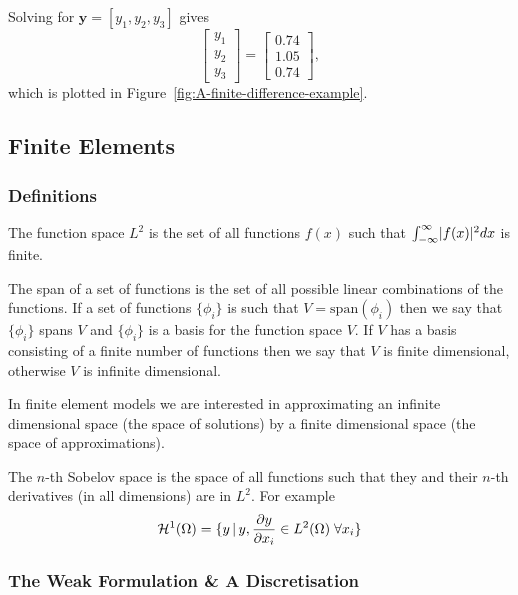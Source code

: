 Solving for $\mathbf{y} = [ y_1, y_2, y_3]$ gives
\begin{equation*}
  \left[
    \begin{array}{c}
      y_{1}\\ y_{2}\\ y_{3}
    \end{array}
  \right]=\left[
    \begin{array}{c}
      0.74\\ 1.05\\ 0.74
    \end{array}
  \right],
\end{equation*}
which is plotted in Figure~\ref{fig:A-finite-difference-example}.


\subsection{Finite Elements}
\label{sec:finite-elements-one-d}

\subsubsection{Definitions}
\label{sec:fem-definitions}

The function space $L^{2}$ is the set of all functions $f(x)$ such
that $\intop_{-\infty}^{\infty}\abs{f(x)}^{2}dx$ is finite.

The span of a set of functions is the set of all possible linear combinations of
the functions. If a set of functions $\{\phi_{i}\}$ is such that
$V=\text{span}(\phi_{i})$ then we say that $\{\phi_{i}\}$ spans $V$ and
$\{\phi_{i}\}$ is a basis for the function space $V$. If $V$ has a basis consisting of a finite number of functions then we say that $V$ is finite dimensional, otherwise $V$ is infinite dimensional.

In finite element models we are interested in approximating an infinite
dimensional space (the space of solutions) by a finite dimensional
space (the space of approximations).

The $n$-th Sobelov space is the space of all functions such that they and their $n$-th derivatives (in all dimensions) are in $L^2$. For example
\begin{equation}
  \label{eq:H1}
  \mathcal{H}^1(\Omega) = \{ y \,|\, y, \frac{\partial y}{\partial x_i} \in L^2(\Omega) \; \forall x_i \}
\end{equation}

\subsubsection{The Weak Formulation \& A Discretisation}
\label{Derivation-of-weighted-residuals}

